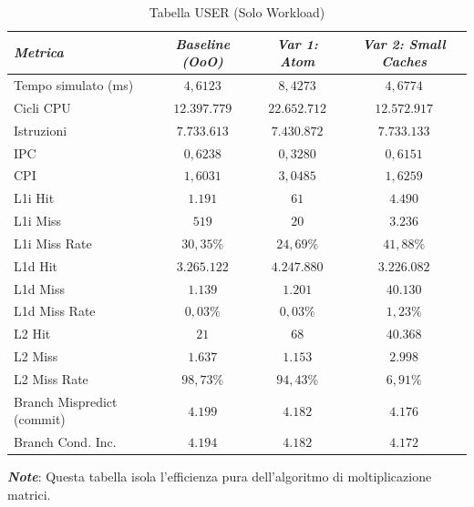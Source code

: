 \documentclass[../../main_document/main.tex]{subfiles}
\begin{document}
\begin{table}[tbh]
    \begin{center}
        \begin{tabular}{|l|c|c|c|}
            \hline
                \textit{Metrica} & 
                \textit{Baseline (OoO)} & 
                \textit{Var 1: Atom} & 
                \textit{Var 2: Small Caches} \\
            \hline
            Tempo simulato (ms) & $4,6123$ & $8,4273$ & $4,6774$ \\
            Cicli CPU & $12.397.779$ & $22.652.712$ & $12.572.917$ \\
            Istruzioni & $7.733.613$ & $7.430.872$ & $7.733.133$ \\
            IPC & $0,6238$ & $0,3280$ & $0,6151$ \\
            CPI & $1,6031$ & $3,0485$ & $1,6259$ \\
            L1i Hit & $1.191$ & $61$ & $4.490$ \\
            L1i Miss & $519$ & $20$ & $3.236$ \\
            L1i Miss Rate & $30,35\%$ & $24,69\%$ & $41,88\%$ \\
            L1d Hit & $3.265.122$ & $4.247.880$ & $3.226.082$ \\
            L1d Miss & $1.139$ & $1.201$ & $40.130$ \\
            L1d Miss Rate & $0,03\%$ & $0,03\%$ & $1,23\%$ \\
            L2 Hit & $21$ & $68$ & $40.368$ \\
            L2 Miss & $1.637$ & $1.153$ & $2.998$ \\
            L2 Miss Rate & $98,73\%$ & $94,43\%$ & $6,91\%$ \\
            Branch Mispredict (commit) & $4.199$ & $4.182$ & $4.176$ \\
            Branch Cond. Inc. & $4.194$ & $4.182$ & $4.172$ \\
            \hline
        \end{tabular}
        \caption{Tabella USER (Solo Workload)}

        \vspace{8pt}
        \textbf{\textit{Note}}: Questa tabella isola l'efficienza pura dell'algoritmo di moltiplicazione matrici.
        \label{tab: tab_4}
    \end{center}
\end{table}

\FloatBarrier
\end{document}
